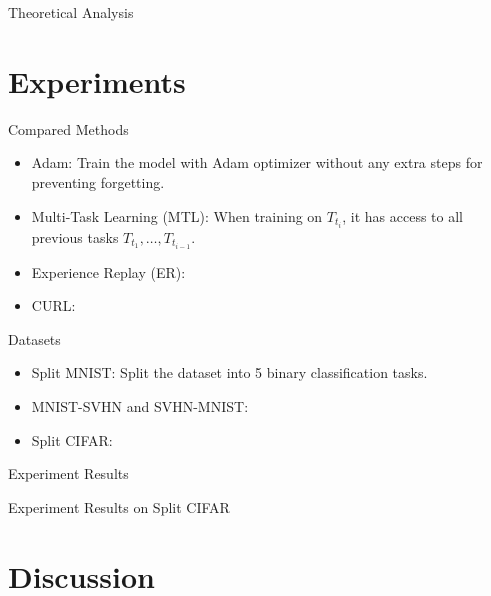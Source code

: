 \documentclass{beamer}
\begin{document}
\begin{frame}{Theoretical Analysis}
  
\end{frame}

\section{Experiments}
\begin{frame}{Compared Methods}
  \begin{itemize}
    \item <1-> Adam: Train the model with Adam optimizer without any extra steps for preventing forgetting.
    \item <1-> Multi-Task Learning (MTL): When training on $T_{t_i}$, it has access to all previous tasks $T_{t_1}, \dots, T_{t_{i-1}}$.
    \item <1-> Experience Replay (ER):
    \item <1-> CURL:
  \end{itemize}
\end{frame}

\begin{frame}{Datasets}
  \begin{itemize}
    \item <1-> Split MNIST: Split the dataset into 5 binary classification tasks. 
    \item <1-> MNIST-SVHN and SVHN-MNIST:
    \item <1-> Split CIFAR:
  \end{itemize}
\end{frame}

\begin{frame}{Experiment Results}
  
\end{frame}

\begin{frame}{Experiment Results on Split CIFAR}
  
\end{frame}

\section{Discussion}
\begin{frame}
  
\end{frame}

\end{document}
